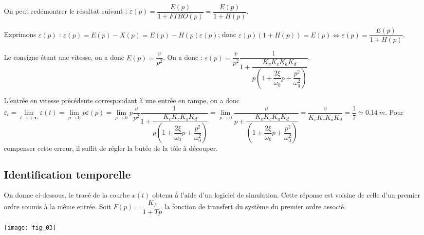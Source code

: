 \begin{multicols}{2}
\ifprof \begin{corrige}
On peut redémontrer le résultat suivant : $\varepsilon(p)=\dfrac{E(p)}{1+FTBO(p)}=\dfrac{E(p)}{1+H(p)}$.

Exprimons $\varepsilon(p)$ : $\varepsilon(p)=E(p)-X(p)=E(p)-H(p)\varepsilon(p)$; donc 
$\varepsilon(p)\left(1+H(p)\right)=E(p)\Longleftrightarrow \varepsilon(p)=\dfrac{E(p)}{1+H(p)}$.

Le consigne étant une vitesse, on a donc $E(p)=\dfrac{v}{p^2}$. On a donc : 
$\varepsilon(p)=\dfrac{v}{p^2}\dfrac{1}{1+\dfrac{K_vK_cK_aK_d}{p\left( 1+\dfrac{2\xi}{\omega_0} p + \dfrac{p^2}{\omega_0^2} \right)}}$.
\end{corrige} \else \fi

\ifprof \begin{corrige}
L'entrée en vitesse précédente correspondant à une entrée en rampe, on a donc 
$
\varepsilon_t
= \lim\limits_{t\to +\infty} \varepsilon (t)
= \lim\limits_{p\to 0} p\varepsilon (p)
= \lim\limits_{p\to 0} p \dfrac{v}{p^2}\dfrac{1}{1+\dfrac{K_vK_cK_aK_d}{p\left( 1+\dfrac{2\xi}{\omega_0} p + \dfrac{p^2}{\omega_0^2} \right)}}
= \lim\limits_{p\to 0}  \dfrac{v}{p+\dfrac{K_vK_cK_aK_d}{\left( 1+\dfrac{2\xi}{\omega_0} p + \dfrac{p^2}{\omega_0^2} \right)}}
=\dfrac{v}{K_vK_cK_aK_d}
=\dfrac{1}{7}\simeq \SI{0,14}{m} $.
Pour compenser cette erreur, il suffit de régler la butée de la tôle à découper.
\end{corrige} \else \fi


\subsection*{Identification temporelle}
\ifprof
\else
On donne ci-dessous, le tracé de la courbe $x(t)$ obtenu à l'aide d'un logiciel de simulation.
Cette réponse est voisine de celle d'un premier ordre soumis à la même entrée.
Soit $F(p)=\dfrac{K_f}{1+Tp}$ la fonction de transfert du système du premier ordre associé.


\begin{center}
\texttt{[image: fig\_03]}
\end{center}
\fi

\ifprof \begin{corrige}


\end{corrige}
\end{multicols}
